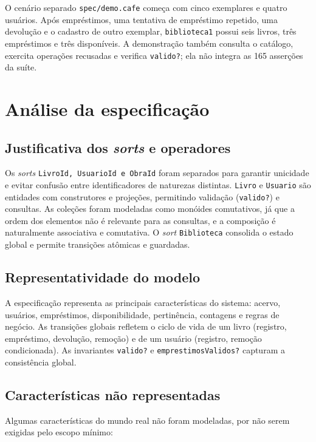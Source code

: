 \documentclass[a4paper,12pt]{article}
\begin{document}
O cenário separado \texttt{spec/\allowbreak{}demo.cafe} começa com cinco exemplares e quatro
usuários. Após empréstimos, uma tentativa de empréstimo repetido, uma devolução
e o cadastro de outro exemplar, \texttt{biblioteca1} possui seis livros, três
empréstimos e três disponíveis. A demonstração também consulta o catálogo,
exercita operações recusadas e verifica \texttt{valido?}; ela não integra as
165 asserções da suíte.

\section{Análise da especificação}

\subsection{Justificativa dos \textit{sorts} e operadores}

Os \textit{sorts} \texttt{LivroId,\allowbreak{} UsuarioId e ObraId} foram separados para
garantir unicidade e evitar confusão entre identificadores de naturezas
distintas. \texttt{Livro} e \texttt{Usuario} são entidades com construtores e
projeções, permitindo validação (\texttt{valido?}) e consultas. As coleções
foram modeladas como monóides comutativos, já que a ordem dos elementos não é
relevante para as consultas, e a composição é naturalmente associativa e
comutativa. O \textit{sort} \texttt{Biblioteca} consolida o estado global e
permite transições atômicas e guardadas.

\subsection{Representatividade do modelo}

A especificação representa as principais características do sistema: acervo,
usuários, empréstimos, disponibilidade, pertinência, contagens e regras de
negócio. As transições globais refletem o ciclo de vida de um livro (registro,
empréstimo, devolução, remoção) e de um usuário (registro, remoção
condicionada). As invariantes \texttt{valido?} e \texttt{emprestimosValidos?}
capturam a consistência global.

\subsection{Características não representadas}

Algumas características do mundo real não foram modeladas, por não serem
exigidas pelo escopo mínimo:
\end{document}
